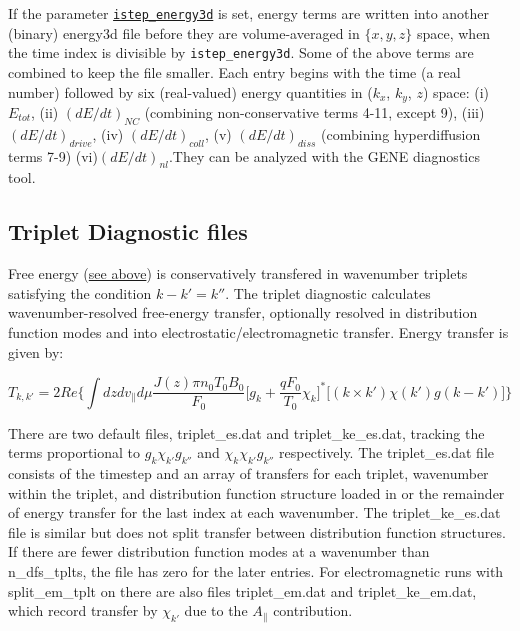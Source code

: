 \documentclass[12pt]{article}
\begin{document}
If the parameter \hyperlink{istep_energy3d}{\tt istep\_energy3d} is set,
energy terms are written into another (binary) energy3d file before they are
volume-averaged in $\{x,y,z\}$ space, when the time index is divisible
by {\tt istep\_energy3d}. Some of the above terms are combined to
keep the file smaller. Each entry begins with the time (a real number)
followed by six (real-valued) energy quantities in ($k_x$, $k_y$, $z$)
space: (i) $E_{tot}$, (ii)
$(dE/dt)_{NC}$ (combining non-conservative terms 4-11, except 9), (iii)
$(dE/dt)_{drive}$, (iv) $(dE/dt)_{coll}$, (v) $(dE/dt)_{diss}$
(combining hyperdiffusion terms 7-9) (vi)$(dE/dt)_{nl}$.They can be analyzed with the
{\sc GENE} diagnostics tool.


\subsection{Triplet Diagnostic files}
\label{subsec:triplet-file}
Free energy (\hyperref[subsec:energy-file]{see above}) is conservatively transfered in wavenumber triplets satisfying the condition $k-k'=k''$. The triplet diagnostic calculates wavenumber-resolved free-energy transfer, optionally resolved in distribution function modes and into electrostatic/electromagnetic transfer. Energy transfer is given by:

$$T_{k,k'}=2Re\Big\{ \int dzdv_{\parallel}d\mu \frac{J(z) \pi n_{0} T_{0} B_{0}}{F_{0}} \Big [g_{k}+\frac{qF_{0}}{T_{0}}\chi_{k}\Big ]^{*}\Big [(k\times k') \chi(k')g(k-k')\Big ]  \Big\}$$

There are two default files, triplet\_es.dat and triplet\_ke\_es.dat, tracking the terms proportional to $g_k \chi_{k'} g_{k''}$ and $\chi_{k} \chi_{k'} g_{k''}$ respectively. The triplet\_es.dat file consists of the timestep and an array of transfers for each triplet, wavenumber within the triplet, and distribution function structure loaded in or the remainder of energy transfer for the last index at each wavenumber. The triplet\_ke\_es.dat file is similar but does not split transfer between distribution function structures. If there are fewer distribution function modes at a wavenumber than n\_dfs\_tplts, the file has zero for the later entries. For electromagnetic runs with split\_em\_tplt on there are also files triplet\_em.dat and triplet\_ke\_em.dat, which record transfer by $\chi_{k'}$ due to the $A_{\parallel}$ contribution.
\end{document}
